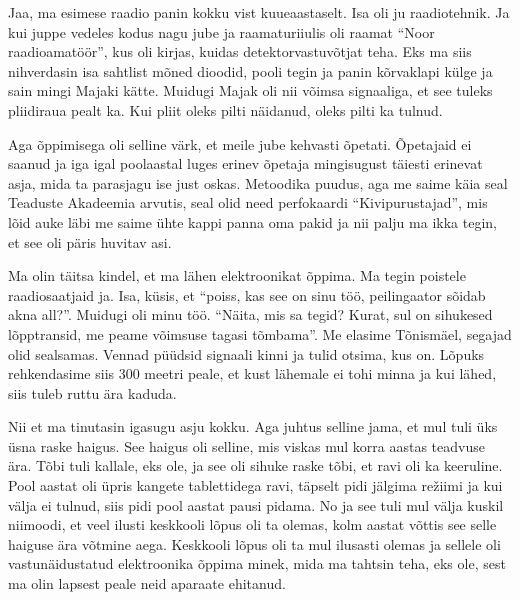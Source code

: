 
Jaa, ma esimese raadio panin kokku vist kuueaastaselt. Isa oli ju raadiotehnik. 
Ja kui juppe vedeles kodus nagu jube ja raamaturiiulis oli raamat \enquote{Noor 
raadioamatöör}, kus oli kirjas, kuidas detektorvastuvõtjat teha. Eks ma siis 
nihverdasin isa sahtlist mõned dioodid, pooli tegin ja panin kõrvaklapi külge 
ja sain mingi Majaki kätte. Muidugi Majak oli nii võimsa signaaliga, et see tuleks 
pliidiraua pealt ka. Kui pliit oleks pilti näidanud, oleks pilti ka tulnud. 

Aga õppimisega oli selline värk, et meile jube kehvasti õpetati. Õpetajaid ei 
saanud ja iga igal poolaastal luges erinev õpetaja mingisugust täiesti erinevat 
asja, mida ta parasjagu ise just oskas. Metoodika puudus, aga me saime käia 
seal Teaduste Akadeemia arvutis, seal olid need perfokaardi 
\enquote{Kivipurustajad}, mis lõid auke läbi me saime ühte kappi panna oma 
pakid ja nii palju ma ikka tegin, et see oli päris huvitav asi. 

Ma olin täitsa kindel, et ma lähen elektroonikat õppima. Ma tegin poistele 
raadiosaatjaid ja. Isa, küsis, et \enquote{poiss, kas see on sinu töö, 
peilingaator sõidab akna all?}. Muidugi oli minu töö. \enquote{Näita, mis sa 
tegid?  Kurat, sul on sihukesed lõpptransid, me peame võimsuse tagasi tõmbama}. 
Me elasime Tõnismäel, segajad olid sealsamas. Vennad püüdsid signaali kinni ja tulid otsima, kus on. 
Lõpuks rehkendasime siis 300 meetri peale, et kust lähemale ei tohi minna ja  
kui lähed, siis tuleb ruttu ära kaduda. 

Nii et ma tinutasin igasugu asju kokku. Aga juhtus selline jama, et mul tuli 
üks üsna raske haigus. See haigus oli selline, mis viskas mul korra aastas 
teadvuse ära. Tõbi tuli kallale, eks ole, ja see oli sihuke raske tõbi, et ravi 
oli ka keeruline. Pool aastat oli üpris kangete tablettidega ravi, täpselt pidi 
jälgima režiimi ja kui välja ei tulnud, siis pidi pool aastat pausi pidama. No 
ja see tuli mul välja kuskil niimoodi, et veel ilusti keskkooli lõpus oli ta 
olemas, kolm aastat võttis see selle haiguse ära võtmine aega. Keskkooli lõpus 
oli ta mul ilusasti olemas ja sellele oli vastunäidustatud  elektroonika õppima 
minek, mida ma tahtsin teha, eks ole, sest ma olin lapsest peale neid aparaate 
ehitanud. 

